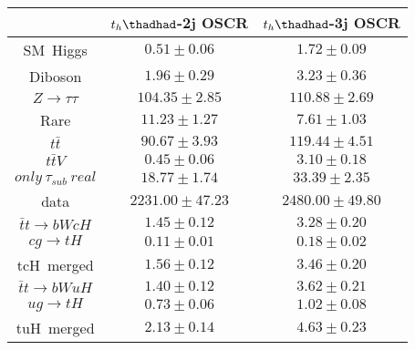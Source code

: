 \centering
\begin{tabular}{|c|c|c|} \hline
 & $t_{h}\thadhad$-2j OSCR & $t_{h}\thadhad$-3j OSCR\\\hline
SM~Higgs & $0.51\pm0.06$ & $1.72\pm0.09$\\\hline
Diboson & $1.96\pm0.29$ & $3.23\pm0.36$\\\hline
$Z\to\tau\tau$ & $104.35\pm2.85$ & $110.88\pm2.69$\\\hline
Rare & $11.23\pm1.27$ & $7.61\pm1.03$\\\hline
$t\bar{t}$ & $90.67\pm3.93$ & $119.44\pm4.51$\\\hline
$t\bar{t}V$ & $0.45\pm0.06$ & $3.10\pm0.18$\\\hline
$only~\tau_{sub}~real$ & $18.77\pm1.74$ & $33.39\pm2.35$\\\hline
data & $2231.00\pm47.23$ & $2480.00\pm49.80$\\\hline
$\bar{t}t\to bWcH$ & $1.45\pm0.12$ & $3.28\pm0.20$\\\hline
$cg\to tH$ & $0.11\pm0.01$ & $0.18\pm0.02$\\\hline
tcH~merged & $1.56\pm0.12$ & $3.46\pm0.20$\\\hline
$\bar{t}t\to bWuH$ & $1.40\pm0.12$ & $3.62\pm0.21$\\\hline
$ug\to tH$ & $0.73\pm0.06$ & $1.02\pm0.08$\\\hline
tuH~merged & $2.13\pm0.14$ & $4.63\pm0.23$\\\hline
\end{tabular}
